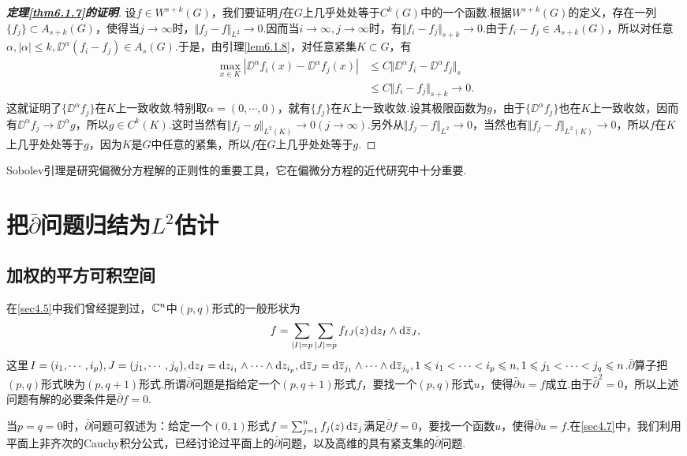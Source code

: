 \begin{proof}[\textbf{定理\ref{thm6.1.7}的证明}]
	设$f\in W^{s+k}(G)$，我们要证明$f$在$G$上几乎处处等于$C^k(G)$中的一个函数.根据$W^{s+k}(G)$的定义，存在一列$\{f_j\}\subset A_{s+k}(G)$，使得当$j\to\infty$时，$\Vert f_j-f\Vert_{L^2}\to0$.因而当$i\to\infty,j\to\infty$时，有$\Vert f_i-f_j\Vert_{s+k}\to0$.由于$f_i-f_j\in A_{s+k}(G)$，所以对任意$\alpha,|\alpha|\le k,\DD^\alpha (f_i-f_j)\in A_s(G)$.于是，由引理\ref{lem6.1.8}，对任意紧集$K\subset G$，有
	\begin{align*}
		\max_{x\in K}|\DD^\alpha f_i(x)-\DD^\alpha f_j(x)|
		&\le C\Vert\DD^\alpha f_i-\DD^\alpha f_j\Vert_s\\
		&\le C\Vert f_i-f_j\Vert_{s+k}\to0.
	\end{align*}
这就证明了$\{\DD^\alpha f_j\}$在$K$上一致收敛.特别取$\alpha=(0,\cdots,0)$，就有$\{f_j\}$在$K$上一致收敛.设其极限函数为$g$，由于$\{\DD^\alpha f_j\}$也在$K$上一致收敛，因而有$\DD^\alpha f_j\to\DD^\alpha g$，所以$g\in C^k(K)$.这时当然有$\Vert f_j-g\Vert_{L^2(K)}\to0(j\to\infty)$.另外从$\Vert f_j-f\Vert_{L^2}\to0$，当然也有$\Vert f_j-f\Vert_{L^2(K)}\to0$，所以$f$在$K$上几乎处处等于$g$，因为$K$是$G$中任意的紧集，所以$f$在$G$上几乎处处等于$g$.
\end{proof}
Sobolev引理是研究偏微分方程解的正则性的重要工具，它在偏微分方程的近代研究中十分重要.
\section{把$\bar{\partial}$问题归结为$L^2$估计\label{sec6.2}}
\subsection{加权的平方可积空间}
在\ref{sec4.5}中我们曾经提到过，$\mathbb C^n$中$(p,q)$形式的一般形状为
\[f=\sum_{|I|=p}\sum_{|J|=p}f_{IJ}(z)\mathop{}\!\mathrm dz_I\wedge\mathop{}\!\mathrm d{}\mkern1mu\overline{\mkern-1muz}_J,\]
这里$I=(i_1,\cdots,i_p),J=(j_1,\cdots,j_q),\mathop{}\!\mathrm dz_I=\mathop{}\!\mathrm dz_{i_1}\wedge\cdots\wedge\mathop{}\!\mathrm dz_{i_p},\mathop{}\!\mathrm d{}\mkern1mu\overline{\mkern-1muz}_J=\mathop{}\!\mathrm d{}\mkern1mu\overline{\mkern-1muz}_{j_1}\wedge\cdots\wedge\mathop{}\!\mathrm d{}\mkern1mu\overline{\mkern-1muz}_{j_q},1\leqslant i_1<\cdots<i_p\leqslant n,1\leqslant j_1<\cdots<j_q\leqslant n$.$\bar{\partial}$算子把$(p,q)$形式映为$(p,q+1)$形式.所谓$\bar{\partial}$问题是指给定一个$(p,q+1)$形式$f$，要找一个$(p,q)$形式$u$，使得$\bar{\partial}u=f$成立.由于$\bar{\partial}^2=0$，所以上述问题有解的必要条件是$\bar{\partial}f=0$.

当$p=q=0$时，$\bar{\partial}$问题可叙述为：给定一个$(0,1)$形式$f=\sum_{j=1}^{n}f_j(z)\mathop{}\!\mathrm d{}\mkern1mu\overline{\mkern-1muz}_j$满足$\bar{\partial}f=0$，要找一个函数$u$，使得$\bar{\partial}u=f$.在\ref{sec4.7}中，我们利用平面上非齐次的Cauchy积分公式，已经讨论过平面上的$\bar{\partial}$问题，以及高维的具有紧支集的$\bar{\partial}$问题.


